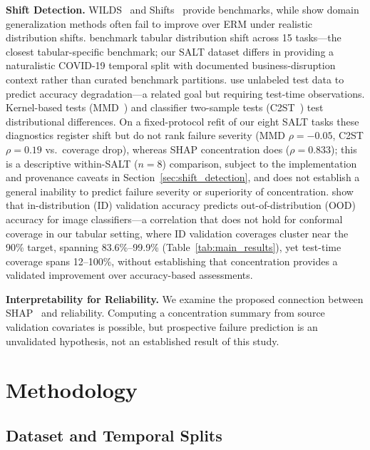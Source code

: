 \documentclass[accepted]{uai2026} %
\begin{document}
\textbf{Shift Detection.} WILDS~\citep{koh2021wilds} and Shifts~\citep{malinin2021shifts} provide benchmarks, while \citet{gulrajani2021search} show domain generalization methods often fail to improve over ERM under realistic distribution shifts. \citet{gardner2023tableshift} benchmark tabular distribution shift across 15 tasks---the closest tabular-specific benchmark; our SALT dataset differs in providing a naturalistic COVID-19 temporal split with documented business-disruption context rather than curated benchmark partitions. \citet{garg2022leveraging} use unlabeled test data to predict accuracy degradation---a related goal but requiring test-time observations. Kernel-based tests (MMD~\citep{gretton2012kernel}) and classifier two-sample tests (C2ST~\citep{lopez2017revisiting}) test distributional differences. On a fixed-protocol refit of our eight SALT tasks these diagnostics register shift but do not rank failure severity (MMD $\rho=-0.05$, C2ST $\rho=0.19$ vs.\ coverage drop), whereas SHAP concentration does ($\rho=0.833$); this is a descriptive within-SALT ($n=8$) comparison, subject to the implementation and provenance caveats in Section~\ref{sec:shift_detection}, and does not establish a general inability to predict failure severity or superiority of concentration. \citet{miller2021accuracy} show that in-distribution (ID) validation accuracy predicts out-of-distribution (OOD) accuracy for image classifiers---a correlation that does not hold for conformal coverage in our tabular setting, where ID validation coverages cluster near the 90\% target, spanning 83.6\%--99.9\% (Table~\ref{tab:main_results}), yet test-time coverage spans 12--100\%, without establishing that concentration provides a validated improvement over accuracy-based assessments.

\textbf{Interpretability for Reliability.} We examine the proposed connection between SHAP~\citep{lundberg2017unified,lundberg2020local} and reliability. Computing a concentration summary from source validation covariates is possible, but prospective failure prediction is an unvalidated hypothesis, not an established result of this study.

\section{Methodology}\label{sec:method}

\subsection{Dataset and Temporal Splits}
\end{document}
